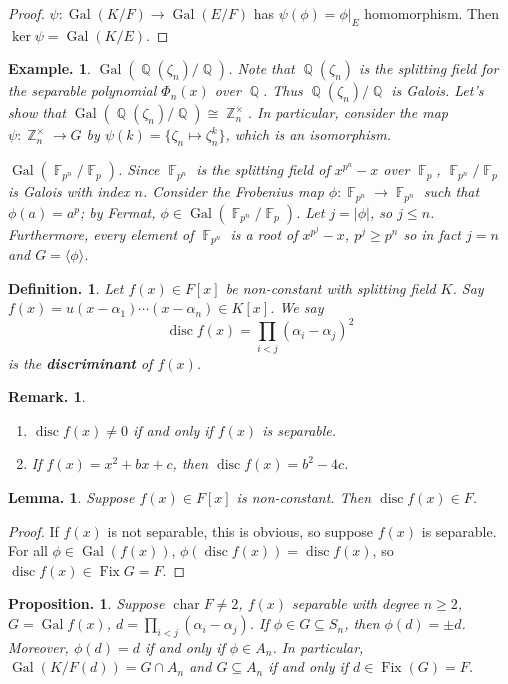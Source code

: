 \documentclass[11pt, a4paper]{memoir}
\DeclareMathOperator{\Q}{{\mathbb{Q}}}
\DeclareMathOperator{\Z}{{\mathbb{Z}}}
\DeclareMathOperator{\F}{{\mathbb{F}}}
\newcommand{\mbf}[1]{{\boldmath\bfseries #1}}
\theoremstyle{change}
\newtheorem{lemma}[theorem]{Lemma.}
\newtheorem{proposition}[theorem]{Proposition.}
\theoremstyle{plain}
\theoremstyle{nonumberplain}
\newtheorem{definition}{Definition.}
\newtheorem{example}{Example.}
\newtheorem{remark}{Remark.}
\newtheorem{proof}{Proof}
\DeclareMathOperator{\chr}{char}
\DeclareMathOperator{\disc}{disc}
\DeclareMathOperator{\Fix}{Fix}
\DeclareMathOperator{\Gal}{Gal}
\numberwithin{equation}{section}
\begin{document}
\begin{proof}
    $\psi:\Gal(K/F)\to\Gal(E/F)$ has $\psi(\phi)=\phi|_E$ homomorphism.
    Then $\ker\psi=\Gal(K/E)$.
\end{proof}
\begin{example}
    $\Gal(\Q(\zeta_n)/\Q)$.
    Note that $\Q(\zeta_n)$ is the splitting field for the separable polynomial $\Phi_n(x)$ over $\Q$.
    Thus $\Q(\zeta_n)/\Q$ is Galois.
    Let's show that $\Gal(\Q(\zeta_n)/\Q)\cong\Z_n^\times$.
    In particular, consider the map $\psi:\Z_n^\times\to G$ by $\psi(k)=\{\zeta_n\mapsto\zeta_n^k\}$, which is an isomorphism.

    $\Gal(\F_{p^n}/\F_p)$.
    Since $\F_{p^n}$ is the splitting field of $x^{p^n}-x$ over $\F_p$, $\F_{p^n}/\F_p$ is Galois with index $n$.
    Consider the Frobenius map $\phi:\F_{p^n}\to \F_{p^n}$ such that $\phi(a)=a^p$; by Fermat, $\phi\in\Gal(\F_{p^n}/\F_p)$.
    Let $j=|\phi|$, so $j\leq n$.
    Furthermore, every element of $\F_{p^n}$ is a root of $x^{p^j}-x$, $p^j\geq p^n$ so in fact $j=n$ and $G=\langle\phi\rangle$.
\end{example}
\begin{definition}
    Let $f(x)\in F[x]$ be non-constant with splitting field $K$.
    Say $f(x)=u(x-\alpha_1)\cdots(x-\alpha_n)\in K[x]$.
    We say
    \begin{equation*}
        \disc f(x)=\prod_{i<j}(\alpha_i-\alpha_j)^2
    \end{equation*}
    is the \mbf{discriminant} of $f(x)$.
\end{definition}
\begin{remark}
    \begin{enumerate}[nl,r]
        \item $\disc f(x)\neq 0$ if and only if $f(x)$ is separable.
        \item If $f(x)=x^2+bx+c$, then $\disc f(x)=b^2-4c$.
    \end{enumerate}
\end{remark}
\begin{lemma}
    Suppose $f(x)\in F[x]$ is non-constant.
    Then $\disc f(x)\in F$.
\end{lemma}
\begin{proof}
    If $f(x)$ is not separable, this is obvious, so suppose $f(x)$ is separable.
    For all $\phi\in\Gal(f(x))$, $\phi(\disc f(x))=\disc f(x)$, so $\disc f(x)\in\Fix G=F$.
\end{proof}
\begin{proposition}
    Suppose $\chr F\neq 2$, $f(x)$ separable with degree $n\geq 2$, $G=\Gal f(x)$, $d=\prod_{i<j}(\alpha_i-\alpha_j)$.
    If $\phi\in G\subseteq S_n$, then $\phi(d)=\pm d$.
    Moreover, $\phi(d)=d$ if and only if $\phi\in A_n$.
    In particular, $\Gal(K/F(d))=G\cap A_n$ and $G\subseteq A_n$ if and only if $d\in\Fix(G)=F$.
\end{proposition}
\end{document}
